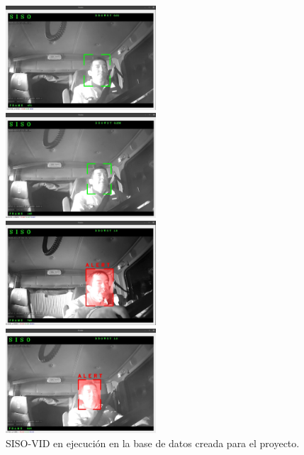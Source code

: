\documentclass{article}
\begin{document}
	\begin{figure}[H]
		\centering
		\begin{multicols}{2}
			\includegraphics[width=0.5\textwidth,keepaspectratio]{img/sisi_vid1}\par 
			\includegraphics[width=0.5\textwidth,keepaspectratio]{img/sisi_vid2}\par 
			\includegraphics[width=0.5\textwidth,keepaspectratio]{img/sisi_vid7}\par 
			\includegraphics[width=0.5\textwidth,keepaspectratio]{img/sisi_vid8}\par 
		\end{multicols}
		\caption{SISO-VID en ejecución en la base de datos creada para el proyecto.}
		\label{img:siso_siso}
\end{figure}
\end{document}
